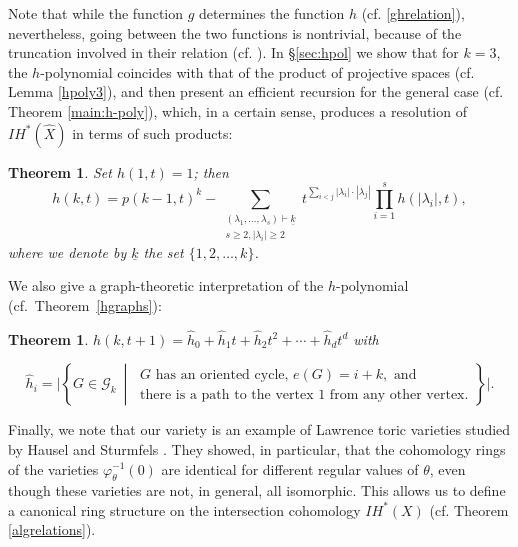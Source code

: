 \documentclass[11pt]{article}
\newtheorem{theorem}[theo]{Theorem}
\theoremstyle{definition}
\numberwithin{equation}{section}
\begin{document}
Note that while  the function $ g $ determines the 
function $ h $ (cf.  \eqref{ghrelation}), nevertheless, going between the two 
functions is nontrivial, 
because of the truncation involved in their relation (cf.  \cite{Stanley}).  
In  \S\ref{sec:hpol} we show that for $ k=3 $, the $ h $-polynomial coincides 
with that of the product of projective spaces (cf.  Lemma \ref{hpoly3}), and 
then present 
an efficient recursion for the general case (cf.  Theorem \ref{main:h-poly}), 
which, in a certain sense, produces 
a resolution of $ IH^*(\widehat{X}) $ in terms of such products:
\begin{theorem} Set $h(1,t)=1$; then
\begin{equation*}
h(k,t)= p(k-1,t)^{k}-\sum_{\substack{ (\lambda_1, \ldots ,\lambda_s)\vdash \underline{k} \\ s\geq 2, |\lambda_i|\geq 2}} t^{\sum_{i<j}|\lambda_i|\cdot|\lambda_j|} \prod_{i=1}^sh(|\lambda_i|,t),
 \end{equation*}
where we denote by $\underline{k}$ the set $\{1,2, \ldots ,k\}$.
\end{theorem}
We also give a graph-theoretic interpretation of the $ h $-polynomial (cf.~Theorem~\ref{hgraphs}):
\begin{theorem} $h(k,t+1) = \hat{h}_0+ \hat{h}_1t+\hat{h}_2t^2+ \cdots +\hat{h}_dt^d$ with

\[
  \hat{h}_i = \bigg| \left\{ G\in\mathcal{G}_{k} \ \middle\vert\
  \begin{array}{l}
    G \text{ has an oriented cycle, } e(G)=i+k, \text{ and } \\
    \text{there is a path to the vertex $1$ from any other vertex.}
  \end{array}\right\} \bigg|.
\]
\end{theorem} 



Finally, we note that our variety is an example of Lawrence toric varieties
studied by Hausel and Sturmfels \cite{HSt}. They showed, in particular, 
that the 
cohomology rings of the varieties $\varphi^{-1}_\theta(0)$ 
are identical for different 
regular values of $ \theta $, even though these varieties are not, in general, 
all isomorphic. This allows us to define a canonical ring structure on the intersection cohomology 
$ IH^*(X) $  (cf.  Theorem \ref{algrelations}).
\end{document}
